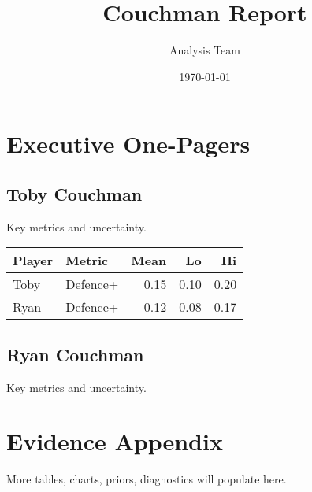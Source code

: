 \documentclass[11pt]{article}
\title{Couchman Report}
\author{Analysis Team}
\date{\today}
\begin{document}
\maketitle

\section*{Executive One-Pagers}
\subsection*{Toby Couchman}
Key metrics and uncertainty.
\begin{table}[h!]
\centering
\begin{tabular}{l l r r r}
\toprule
Player & Metric & Mean & Lo & Hi \\
\midrule
Toby & Defence+ & 0.15 & 0.10 & 0.20 \\
Ryan & Defence+ & 0.12 & 0.08 & 0.17 \\
\bottomrule
\end{tabular}
\end{table}

\subsection*{Ryan Couchman}
Key metrics and uncertainty.

\section{Evidence Appendix}
More tables, charts, priors, diagnostics will populate here.
\end{document}
